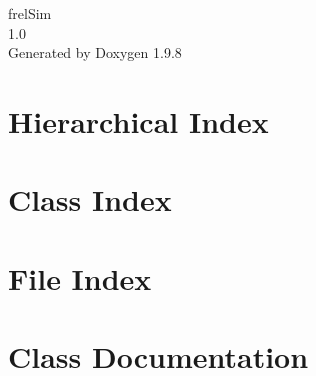 \documentclass[twoside]{book}
\newcommand{\+}{\discretionary{\mbox{\scriptsize$\hookleftarrow$}}{}{}}
\newcommand{\clearemptydoublepage}{%
    \newpage{\pagestyle{empty}\cleardoublepage}%
  }
\begin{document}
  \raggedbottom
    \hypersetup{pageanchor=false,
                bookmarksnumbered=true,
                pdfencoding=unicode
               }
  \begin{titlepage}
  \vspace*{7cm}
  \begin{center}%
  {\Large frel\+Sim}\\
  [1ex]\large 1.\+0 \\
  \vspace*{1cm}
  {\large Generated by Doxygen 1.9.8}\\
  \end{center}
  \end{titlepage}
  \clearemptydoublepage
  \tableofcontents
  \clearemptydoublepage
  \hypersetup{pageanchor=true}

\chapter{Hierarchical Index}

\chapter{Class Index}

\chapter{File Index}

\chapter{Class Documentation}














\end{document}
